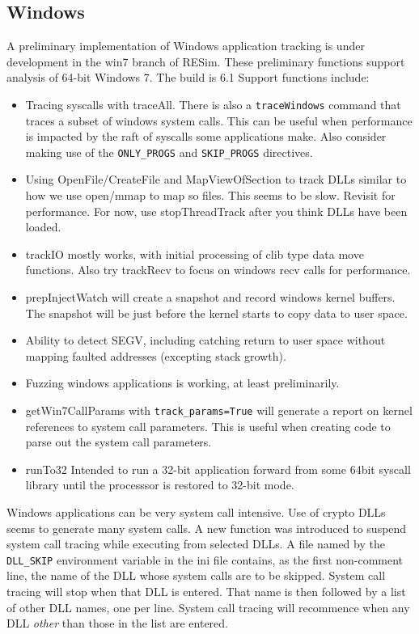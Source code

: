\documentclass[titlepage]{article}
\begin{document}
\begin{appendices}
\section{Windows}
\label{Windows}
A preliminary implementation of Windows application tracking is under development in the win7 branch of RESim.
These preliminary functions support analysis of 64-bit Windows 7.  The build is 6.1
Support functions include:
\begin{itemize}
\item Tracing syscalls with traceAll.  There is also a {\tt traceWindows} command that traces a subset of windows system calls.  This can be useful when performance is 
impacted by the raft of syscalls some applications make.  Also consider making use of the {\tt ONLY\_PROGS} and {\tt SKIP\_PROGS} directives.

\item Using OpenFile/CreateFile and MapViewOfSection to track DLLs similar to how we use open/mmap to map so files.  This seems to be slow.
Revisit for performance.  For now, use stopThreadTrack after you think DLLs have been loaded.

\item trackIO mostly works, with initial processing of clib type data move functions.  Also try trackRecv to focus on windows recv calls for performance.  

\item prepInjectWatch will create a snapshot and record windows kernel buffers.  The snapshot will be just before the kernel starts to copy data to user space.

\item Ability to detect SEGV, including catching return to user space without mapping faulted addresses (excepting stack growth).

\item Fuzzing windows applications is working, at least preliminarily.

\item getWin7CallParams with {\tt track\_params=True} will generate a report on kernel references to system call parameters.  This is useful when creating code to parse out
the system call parameters.

\item runTo32 Intended to run a 32-bit application forward from some 64bit syscall library until the processsor is restored to 32-bit mode.
\end{itemize}
\label{dll_skip}
Windows applications can be very system call intensive.  Use of crypto DLLs seems to generate many system calls.  A new function was introduced to suspend 
system call tracing while executing from selected DLLs. A file named by the {\tt DLL\_SKIP} environment variable in the ini file contains, as the first non-comment line, the name of the DLL whose system calls are to be 
skipped. System call tracing will stop when that DLL is entered.  That name is then followed by a list of other DLL names, one per line.  
System call tracing will recommence when any DLL \textit{other} than those in the list are entered.


\end{appendices}
\end{document}

